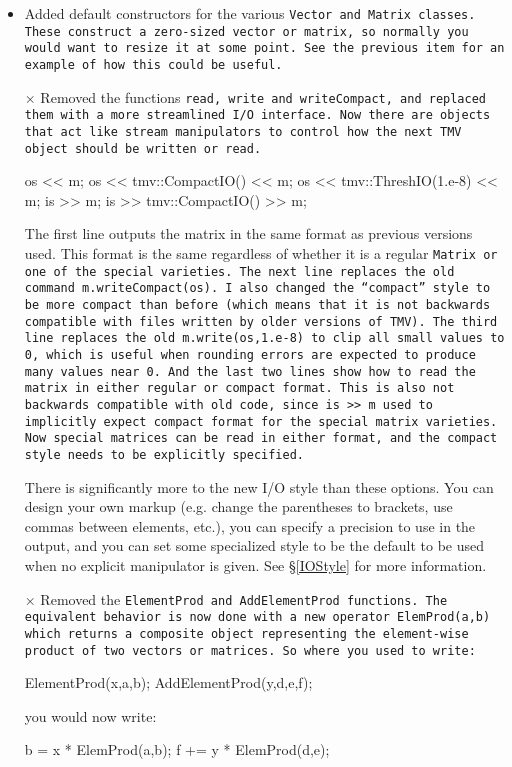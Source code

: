 \begin{itemize}
\item
Added default constructors for the various \tt{Vector} and \tt{Matrix} classes.  These construct a zero-sized vector or matrix, so normally you would want to resize it at some point.  See the previous item for an example of how this could be useful.

\item[$\times$]
Removed the functions \tt{read}, \tt{write} and \tt{writeCompact}, and replaced them with a more streamlined I/O interface. Now there are objects that act like stream manipulators to control how the next TMV object should be written or read.
\begin{tmvcode}
os << m;  
os << tmv::CompactIO() << m;
os << tmv::ThreshIO(1.e-8) << m;
is >> m;
is >> tmv::CompactIO() >> m;
\end{tmvcode}

The first line outputs the matrix in the same format as previous versions used.  This format is the same regardless of whether it is a regular \tt{Matrix} or one of the special varieties.  
The next line replaces the old command \tt{m.writeCompact(os)}.  I also changed the ``compact'' style to be more compact than before (which means that it is not backwards compatible with files written by older versions of TMV).  
The third line replaces the old \tt{m.write(os,1.e-8)} to clip all small values to 0, which is useful when rounding errors are expected to produce many values near 0.  
And the last two lines show how to read the matrix in either regular or compact format.  This is also not backwards compatible with old code, since \tt{is >> m} used to implicitly expect compact format for the special matrix varieties.  Now special matrices can be read in either format, and the compact style needs to be explicitly specified.  

There is significantly more to the new I/O style than these options.  You can design your own markup (e.g. change the parentheses to brackets, use commas between elements, etc.), you can specify a precision to use in the output, and you can set some specialized style to be the default to be used when no explicit manipulator is given.  See \S\ref{IOStyle} for more information.

\item[$\times$] Removed the \tt{ElementProd} and \tt{AddElementProd} functions.  The equivalent behavior is now done with a new operator \tt{ElemProd(a,b)} which returns a composite object representing the element-wise product of two vectors or matrices.  So where you used to write:
\begin{tmvcode}
ElementProd(x,a,b);
AddElementProd(y,d,e,f);
\end{tmvcode}
you would now write:
\begin{tmvcode}
b = x * ElemProd(a,b);
f += y * ElemProd(d,e);
\end{tmvcode}


\end{itemize}
